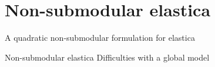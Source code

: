 \section{Non-submodular elastica}

\begin{frame}
\begin{center}
\huge
A quadratic non-submodular formulation for elastica
\end{center}
\end{frame}

\begin{frame}
	{Non-submodular elastica}	
	{Difficulties with a global model}
\begin{minipage}[t][0.6\textheight][t]{1\textwidth}
\begin{minipage}{0.35\textwidth}
\end{minipage}
\end{minipage}
\end{frame}
